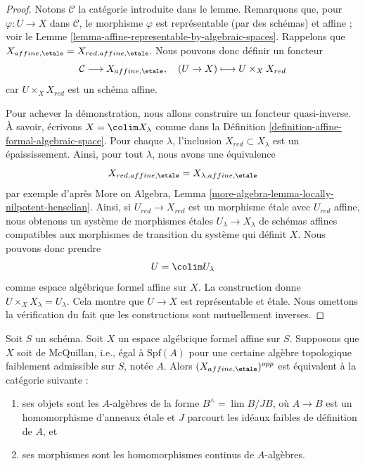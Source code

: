 \begin{proof}
Notons $\mathcal{C}$ la catégorie introduite dans le lemme.
Remarquons que, pour $\varphi : U \to X$ dans $\mathcal{C}$, le
morphisme $\varphi$ est représentable (par des schémas) et affine ; voir le
Lemme \ref{lemma-affine-representable-by-algebraic-spaces}.
Rappelons que $X_{affine, \etale} = X_{red, affine, \etale}$.
Nous pouvons donc définir un foncteur
$$
\mathcal{C} \longrightarrow X_{affine, \etale},\quad
(U \to X) \longmapsto U \times_X X_{red}
$$
car $U \times_X X_{red}$ est un schéma affine.

\medskip\noindent
Pour achever la démonstration, nous allons construire un foncteur quasi-inverse.
À savoir, écrivons $X = \colim X_\lambda$ comme dans la
Définition \ref{definition-affine-formal-algebraic-space}.
Pour chaque $\lambda$, l'inclusion $X_{red} \subset X_\lambda$
est un épaississement. Ainsi, pour tout $\lambda$, nous avons une
équivalence
$$
X_{red, affine, \etale} = X_{\lambda, affine, \etale}
$$
par exemple d'après
More on Algebra, Lemma \ref{more-algebra-lemma-locally-nilpotent-henselian}.
Ainsi, si $U_{red} \to X_{red}$ est un morphisme \'etale avec
$U_{red}$ affine, nous obtenons un système de morphismes \'etales
$U_\lambda \to X_\lambda$ de schémas affines compatibles aux
morphismes de transition du système qui définit $X$. Nous pouvons donc prendre
$$
U = \colim U_\lambda
$$
comme espace algébrique formel affine sur $X$. La construction donne
$U \times_X X_\lambda = U_\lambda$. Cela montre que $U \to X$ est
représentable et \'etale. Nous omettons la vérification du fait que les constructions
sont mutuellement inverses.
\end{proof}

\begin{lemma}
\label{lemma-affine-etale-mcquillan}
Soit $S$ un schéma. Soit $X$ un espace algébrique
formel affine sur $S$. Supposons que $X$ soit de McQuillan, i.e.,
égal à $\text{Spf}(A)$ pour une certaine
algèbre topologique faiblement admissible sur $S$, notée $A$.
Alors $(X_{affine, \etale})^{opp}$ est équivalent à
la catégorie suivante :
\begin{enumerate}
\item ses objets sont les $A$-algèbres de la forme
$B^\wedge = \lim B/JB$, où $A \to B$ est un homomorphisme d'anneaux \'etale
et $J$ parcourt les idéaux faibles de définition de $A$, et
\item ses morphismes sont les homomorphismes continus de $A$-algèbres.
\end{enumerate}
\end{lemma}

